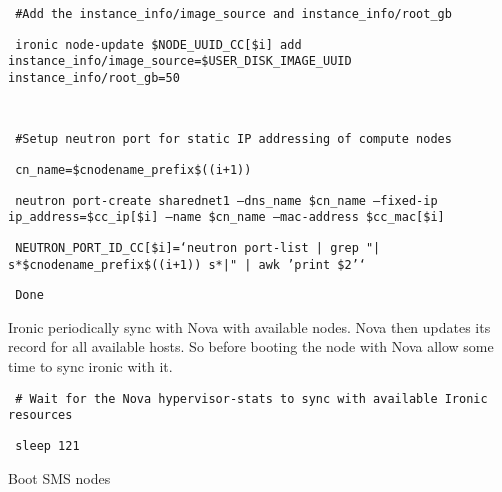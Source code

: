 \documentclass[12pt]{article}
\begin{document}
\begin{bash}\texttt{\small{         \#Add the instance\_info/image\_source and instance\_info/root\_gb}}\end{bash}
\begin{bash}\texttt{\small{         ironic node-update \${NODE\_UUID\_CC[\$i]} add instance\_info/image\_source=\${USER\_DISK\_IMAGE\_UUID} instance\_info/root\_gb=50}}\end{bash}
\begin{bash}\texttt{\small{ }}\end{bash}
\begin{bash}\texttt{\small{         \#Setup neutron port for static IP addressing of compute nodes}}\end{bash}
\begin{bash}\texttt{\small{         cn\_name=\${cnodename\_prefix}\$((i+1))}}\end{bash}
\begin{bash}\texttt{\small{         neutron port-create sharednet1 --dns\_name \$cn\_name --fixed-ip ip\_address=\${cc\_ip[\$i]} --name \$cn\_name --mac-address \${cc\_mac[\$i]}}}\end{bash}
\begin{bash}\texttt{\small{         NEUTRON\_PORT\_ID\_CC[\$i]=`neutron port-list | grep "|\\s*\${cnodename\_prefix}\$((i+1))\\s*|" | awk '{print \$2}'`}}\end{bash}
\begin{bash}\texttt{\small{     Done}}\end{bash}

 Ironic periodically sync with Nova with available nodes. Nova then updates its record for all available hosts. So before booting the node with Nova allow some time to sync ironic with it. 

\begin{bash}\texttt{\small{ \# Wait for the Nova hypervisor-stats to sync with available Ironic resources}}\end{bash}
\begin{bash}\texttt{\small{ sleep 121}}\end{bash}

Boot SMS nodes
\end{document}
